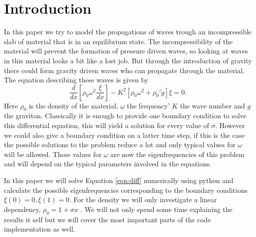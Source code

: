 \section{Introduction}

In this paper we try to model the propagations of waves trough an incompressible slab of material that is in an equilibrium state.
The incompressibility of the material will prevent the formation of pressure driven waves, so looking at waves in this material looks a bit like a lost job.
But through the introduction of gravity there could form gravity driven waves who can propagate through the material. 
The equation describing these waves is given by
\begin{equation}\label{eqn:diff}
\dfrac{d}{dx} \left[\rho_{0}\omega^2\dfrac{\xi}{dx}\right] -K^2 \left[\rho_{0}\omega^2 + \rho_{0}'g\right]\xi = 0.
\end{equation}
Here $ \rho_{0} $ is the density of the material, $ \omega $ the frequency' $ K $ the wave number and $ g $ the graviton.
Classically it is enough to provide one boundary condition to solve this differential equation, this will yield a solution for every value of $ \sigma $.
However we could also give a boundary condition on a latter time step, if this is the case the possible solutions to the problem reduce a lot and only typical values for $ \omega $ will be allowed.
These values for $ \omega $ are now the eigenfrequencies of this problem and will depend on the typical parameters involved in the equations.

In this paper we will solve Equation \ref{eqn:diff} numerically using python and calculate the possible eigenfrequencies corresponding to the boundary conditions $ \xi(0)=0,\xi(1)=0 $.
For the density we will only investigate a linear dependency, $ \rho_{0} = 1 + \sigma x $ .
We will not only spend some time explaining the results it self but we will cover the most important parts of the code implementation as well.